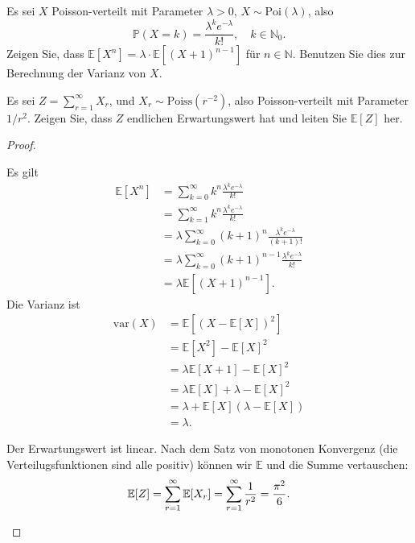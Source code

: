 \begin{Problem}
	\begin{parts}
		\item Es sei $X$ Poisson-verteilt mit Parameter $\lambda > 0$, $X \sim \text{Poi}(\lambda)$, also
		\[
		\mathbb{P}(X = k) = \frac{\lambda^k e^{-\lambda}}{k!}, \quad k \in \mathbb{N}_0.
		\]
		Zeigen Sie, dass $\mathbb{E}[X^n] = \lambda \cdot \mathbb{E}[(X + 1)^{n-1}]$ für $n \in \mathbb{N}$. Benutzen Sie dies zur Berechnung der Varianz von $X$.
		
		\item Es sei $Z = \sum_{r=1}^\infty X_r$, und $X_r \sim \text{Poiss}(r^{-2})$, also Poisson-verteilt mit Parameter $1/r^2$.  
		Zeigen Sie, dass $Z$ endlichen Erwartungswert hat und leiten Sie $\mathbb{E}[Z]$ her.
	\end{parts}
\end{Problem}
\begin{proof}
	\begin{parts}
		\item Es gilt
		\begin{align*}
			\mathbb{E}[X^n] &= \sum_{k=0}^\infty k^n \frac{\lambda^k e^{-\lambda}}{k!}\\
			&=\sum_{k=1}^\infty k^n \frac{\lambda^k e^{-\lambda}}{k!}\\
			&=\lambda \sum_{k=0}^\infty (k+1)^n \frac{\lambda^k e^{-\lambda}}{(k+1)!}\\
			&=\lambda \sum_{k=0}^\infty (k+1)^{n-1} \frac{\lambda^k e^{-\lambda}}{k!}\\
			&= \lambda\mathbb{E}[(X+1)^{n-1}].
		\end{align*}
	Die Varianz ist
	\begin{align*}
	\text{var}(X) &= \mathbb{E}[(X - \mathbb{E}[X])^2] \\
	&=\mathbb{E}[X^2]-\mathbb{E}[X]^2 \\ 
	&=\lambda \mathbb{E}[X+1] - \mathbb{E}[X]^2\\
	&= \lambda \mathbb{E}[X] + \lambda - \mathbb{E}[X]^2\\
	&= \lambda + \mathbb{E}[X](\lambda - \mathbb{E}[X])\\
	&=\lambda.
\end{align*}
\item Der Erwartungswert ist linear. Nach dem Satz von monotonen Konvergenz (die Verteilugsfunktionen sind alle positiv) können wir $\mathbb{E}$ und die Summe vertauschen:
\[\mathbb{E}[Z] = \sum_{r=1}^\infty \mathbb{E}[X_r] = \sum_{r=1}^\infty \frac 1{r^2} = \frac{\pi^2}{6}.\qedhere\]
	\end{parts}
\end{proof}